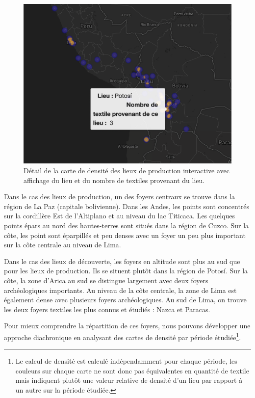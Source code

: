  \begin{figure}[!h]
	\begin{center}
		\includegraphics[width=12cm]{../images/heatmap_leaflet.png}
		\caption{Détail de la carte de densité des lieux de production interactive avec affichage du lieu et du nombre de textiles provenant du lieu.}
		\label{fig:leaflet_density}
	 \end{center}
\end{figure}

Dans le cas des lieux de production, un des foyers centraux se trouve dans la région de La Paz (capitale bolivienne). Dans les Andes, les points sont concentrés sur la cordillère Est de l'Altiplano et au niveau du lac Titicaca. Les quelques points épars au nord des hautes-terres sont situés dans la région de Cuzco. Sur la côte, les point sont éparpillés et peu denses avec un foyer un peu plus important sur la côte centrale au niveau de Lima. 

Dans le cas des lieux de découverte, les foyers en altitude sont plus au sud que pour les lieux de production. Ils se situent plutôt dans la région de Potosí. Sur la côte, la zone d'Arica au sud se distingue largement avec deux foyers archéologiques importants. Au niveau de la côte centrale, la zone de Lima est également dense avec plusieurs foyers archéologiques. Au sud de Lima, on trouve les deux foyers textiles les plus connus et étudiés : Nazca et Paracas.

Pour mieux comprendre la répartition de ces foyers, nous pouvons développer une approche diachronique en analysant des cartes de densité par période étudiée\footnote{Le calcul de densité est calculé indépendamment pour chaque période, les couleurs sur chaque carte ne sont donc pas équivalentes en quantité de textile mais indiquent plutôt une valeur relative de densité d'un lieu par rapport à un autre sur la période étudiée.}. 

